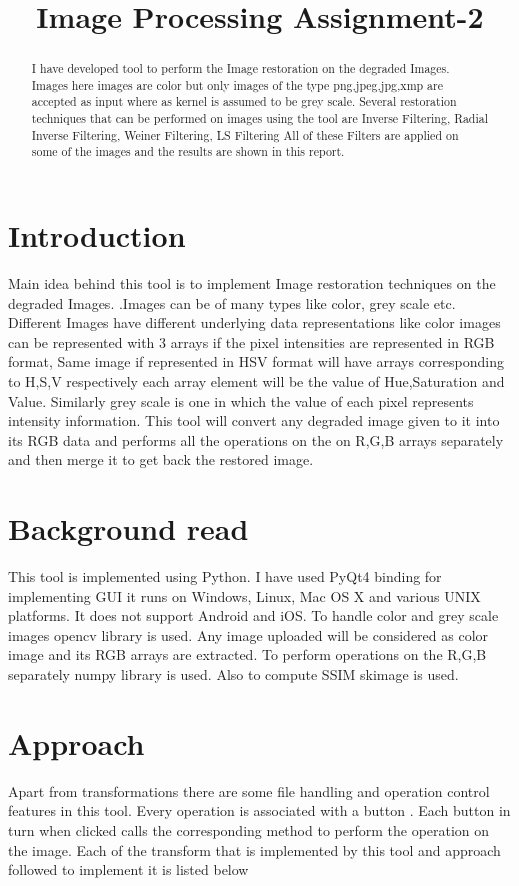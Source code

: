 \documentclass{article}
\title{Image Processing Assignment-2}
\begin{document}
%
\maketitle
%
\begin{abstract}
I have developed tool to perform the Image restoration on the degraded Images. Images here images are color but only images of the type png,jpeg,jpg,xmp are accepted as input where as kernel is assumed to be grey scale. Several restoration techniques that can be performed on  images using the tool are Inverse Filtering, Radial Inverse Filtering, Weiner Filtering, LS Filtering All of these Filters are applied on some of the images and the results are shown in this report.
\end{abstract}

\section{Introduction}
\label{sec:intro}
Main idea behind this tool is to implement Image restoration techniques on the degraded Images.  .Images can be of many types like color, grey scale etc. Different Images have different underlying data representations like color images can be represented with 3 arrays if the pixel intensities are represented in RGB format, Same image if represented in HSV format will have arrays corresponding to H,S,V respectively each array element will be the value of Hue,Saturation and Value. Similarly grey scale  is one in which the value of each pixel represents intensity information. This tool will convert any degraded image given to it into its RGB data and performs all the operations on the on R,G,B arrays separately and then merge it  to get back the restored image.


\section{Background read}
\label{sec:format}
This tool is implemented using Python\cite{WEBSITE:10}. I have used PyQt4\cite{WEBSITE:9} binding for implementing GUI it runs on Windows, Linux, Mac OS X and various UNIX platforms. It does not support Android and iOS. To handle color and grey scale images opencv\cite{WEBSITE:4} library is used. Any image uploaded will be considered as color image and its RGB arrays\cite{WEBSITE:2} are extracted. To perform operations on the R,G,B separately  numpy\cite{WEBSITE:1} library is used. Also to compute SSIM skimage is used.


\section{Approach}
\label{sec:pagestyle}
Apart from transformations there are some file handling and operation control features in this tool. Every operation is associated with a button . Each button in turn when clicked calls the corresponding method to perform the operation on the image.  Each of the transform that is implemented by this tool and approach followed to implement it is listed below
\end{document}
